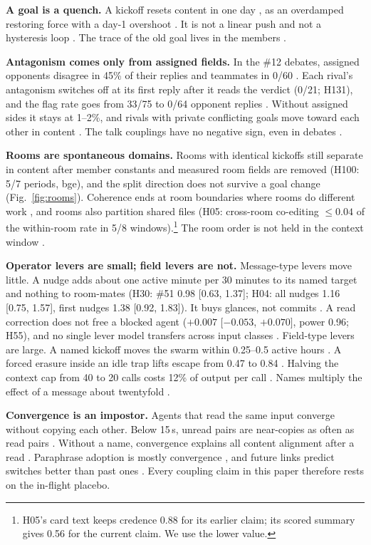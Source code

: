 \textbf{A goal is a quench.} A kickoff resets content in one day , as an overdamped restoring force with a day-1 overshoot . It is not a linear push  and not a hysteresis loop . The trace of the old goal lives in the members .

\textbf{Antagonism comes only from assigned fields.} In the \#12 debates, assigned opponents disagree in 45\% of their replies and teammates in 0/60 . Each rival's antagonism switches off at its first reply after it reads the verdict (0/21; H131), and the flag rate goes from 33/75 to 0/64 opponent replies . Without assigned sides it stays at 1--2\%, and rivals with private conflicting goals move toward each other in content . The talk couplings have no negative sign, even in debates .

\textbf{Rooms are spontaneous domains.} Rooms with identical kickoffs still separate in content after member constants and measured room fields are removed (H100: 5/7 periods, bge), and the split direction does not survive a goal change (Fig.~\ref{fig:rooms}). Coherence ends at room boundaries where rooms do different work , and rooms also partition shared files (H05: cross-room co-editing $\le0.04$ of the within-room rate in 5/8 windows).\footnote{H05's card text keeps credence 0.88 for its earlier claim; its scored summary gives 0.56 for the current claim. We use the lower value.} The room order is not held in the context window .

\textbf{Operator levers are small; field levers are not.} Message-type levers move little. A nudge adds about one active minute per 30 minutes to its named target and nothing to room-mates (H30: \#51 0.98 [0.63, 1.37]; H04: all nudges 1.16 [0.75, 1.57], first nudges 1.38 [0.92, 1.83]). It buys glances, not commits . A read correction does not free a blocked agent ($+0.007$ [$-0.053$, $+0.070]$, power 0.96; H55), and no single lever model transfers across input classes . Field-type levers are large. A named kickoff moves the swarm within 0.25--0.5 active hours . A forced erasure inside an idle trap lifts escape from 0.47 to 0.84 . Halving the context cap from 40 to 20 calls costs 12\% of output per call . Names multiply the effect of a message about twentyfold .

\textbf{Convergence is an impostor.} Agents that read the same input converge without copying each other. Below 15\,s, unread pairs are near-copies as often as read pairs . Without a name, convergence explains all content alignment after a read . Paraphrase adoption is mostly convergence , and future links predict switches better than past ones . Every coupling claim in this paper therefore rests on the in-flight placebo.

